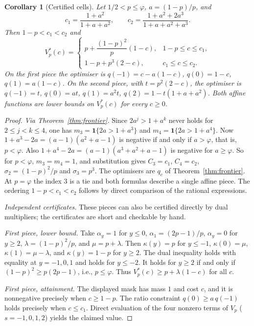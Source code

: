 \documentclass{article}
\newtheorem{corollary}[theorem]{Corollary}
\theoremstyle{definition}
\theoremstyle{remark}
\begin{document}
\begin{corollary}[Certified cells]\label{cor:cells}
Let \(1/2<p\le\varphi\), \(a=(1-p)/p\), and
\[
c_1=\frac{1+a^2}{1+a+a^2},\qquad c_2=\frac{1+a^2+2a^3}{1+a+a^2+a^3}.
\]
Then \(1-p<c_1<c_2\) and
\[
V_p^*(c)=\begin{cases}
p+\dfrac{(1-p)^2}{p}(1-c), & 1-p\le c\le c_1,\\[2mm]
1-p+p^3(2-c), & c_1\le c\le c_2.
\end{cases}
\]
On the first piece the optimiser is \(q(-1)=c-a(1-c)\), \(q(0)=1-c\), \(q(1)=a(1-c)\). On the second piece, with \(t=p^2(2-c)\), the optimiser is \(q(-1)=t\), \(q(0)=at\), \(q(1)=a^2t\), \(q(2)=1-t(1+a+a^2)\). Both affine functions are lower bounds on \(V_p^*(c)\) for every \(c\ge0\).
\end{corollary}
\begin{proof}
\emph{Via Theorem~\ref{thm:frontier}.} Since \(2a^j>1+a^k\) never holds for \(2\le j<k\le4\), one has \(m_3=\mathbf 1\{2a>1+a^3\}\) and \(m_4=\mathbf 1\{2a>1+a^4\}\). Now \(1+a^3-2a=(a-1)(a^2+a-1)\) is negative if and only if \(a>\varphi\), that is, \(p<\varphi\). Also \(1+a^4-2a=(a-1)(a^3+a^2+a-1)\) is negative for \(a\ge\varphi\). So for \(p<\varphi\), \(m_3=m_4=1\), and substitution gives \(C_3=c_1\), \(C_4=c_2\), \(\sigma_2=(1-p)^2/p\) and \(\sigma_3=p^3\). The optimisers are \(q_c\) of Theorem~\ref{thm:frontier}. At \(p=\varphi\) the index \(3\) is a tie and both formulas describe a single affine piece. The ordering \(1-p<c_1<c_2\) follows by direct comparison of the rational expressions.

\emph{Independent certificates.} These pieces can also be certified directly by dual multipliers; the certificates are short and checkable by hand.

\emph{First piece, lower bound.} Take \(\alpha_y=1\) for \(y\le0\), \(\alpha_1=(2p-1)/p\), \(\alpha_y=0\) for \(y\ge2\), \(\lambda=(1-p)^2/p\), and \(\mu=p+\lambda\). Then \(\kappa(y)=p\) for \(y\le-1\), \(\kappa(0)=\mu\), \(\kappa(1)=\mu-\lambda\), and \(\kappa(y)=1-p\) for \(y\ge2\). The dual inequality holds with equality at \(y=-1,0,1\) and holds for \(y\le-2\). It holds for \(y\ge2\) if and only if \((1-p)^2\ge p(2p-1)\), i.e., \(p\le\varphi\). Thus \(V_p^*(c)\ge p+\lambda(1-c)\) for all \(c\).

\emph{First piece, attainment.} The displayed mask has mass \(1\) and cost \(c\), and it is nonnegative precisely when \(c\ge1-p\). The ratio constraint \(q(0)\ge a\,q(-1)\) holds precisely when \(c\le c_1\). Direct evaluation of the four nonzero terms of \(V_p\) (\(s=-1,0,1,2\)) yields the claimed value.


\end{proof}
\end{document}
